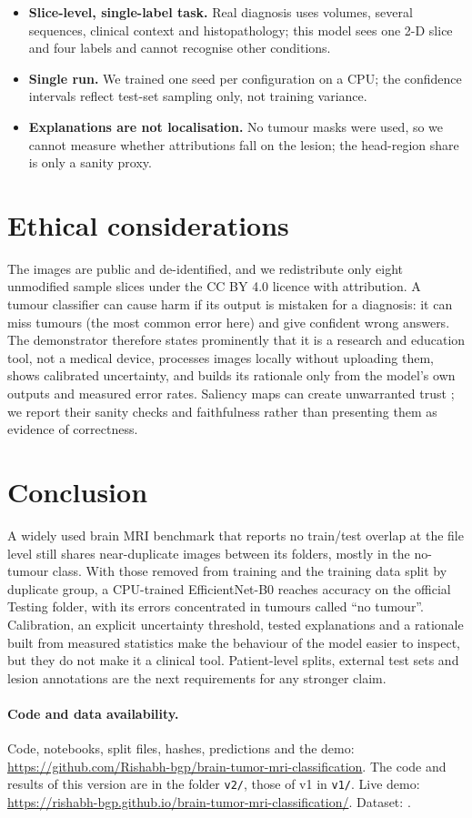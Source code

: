 \documentclass[11pt,a4paper]{article}
\begin{document}
\begin{itemize}
\item \textbf{Slice-level, single-label task.} Real diagnosis uses volumes, several sequences, clinical context and histopathology; this model sees one 2-D slice and four labels and cannot recognise other conditions.
\item \textbf{Single run.} We trained one seed per configuration on a CPU; the confidence intervals reflect test-set sampling only, not training variance.
\item \textbf{Explanations are not localisation.} No tumour masks were used, so we cannot measure whether attributions fall on the lesion; the head-region share is only a sanity proxy.
\end{itemize}

\section{Ethical considerations}
The images are public and de-identified, and we redistribute only eight unmodified sample slices under the CC BY 4.0 licence with attribution. A tumour classifier can cause harm if its output is mistaken for a diagnosis: it can miss tumours (the most common error here) and give confident wrong answers. The demonstrator therefore states prominently that it is a research and education tool, not a medical device, processes images locally without uploading them, shows calibrated uncertainty, and builds its rationale only from the model's own outputs and measured error rates. Saliency maps can create unwarranted trust \citep{adebayo2018,arun2021}; we report their sanity checks and faithfulness rather than presenting them as evidence of correctness.

\section{Conclusion}
A widely used brain MRI benchmark that reports no train/test overlap at the file level still shares near-duplicate images between its folders, mostly in the no-tumour class. With those removed from training and the training data split by duplicate group, a CPU-trained EfficientNet-B0 reaches \AccCFull{} accuracy on the official Testing folder, with its errors concentrated in tumours called ``no tumour''. Calibration, an explicit uncertainty threshold, tested explanations and a rationale built from measured statistics make the behaviour of the model easier to inspect, but they do not make it a clinical tool. Patient-level splits, external test sets and lesion annotations are the next requirements for any stronger claim.

\paragraph{Code and data availability.} Code, notebooks, split files, hashes, predictions and the demo: \url{https://github.com/Rishabh-bgp/brain-tumor-mri-classification}. The code and results of this version are in the folder \texttt{v2/}, those of v1 in \texttt{v1/}. Live demo: \url{https://rishabh-bgp.github.io/brain-tumor-mri-classification/}. Dataset: \citet{nickparvar2021}.



\end{document}
